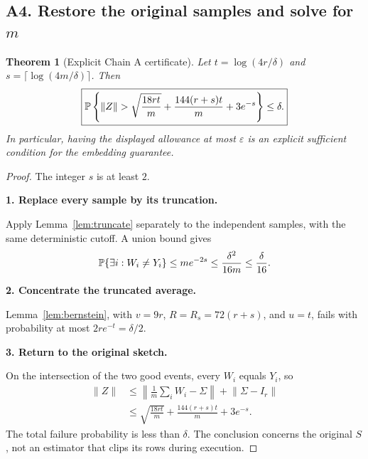 \documentclass[11pt]{article}
\numberwithin{equation}{section}
\newtheorem{theorem}{Theorem}[section]
\theoremstyle{definition}\newtheorem{definition}[theorem]{Definition}
\theoremstyle{remark}\newtheorem{remark}[theorem]{Remark}
\newcommand{\norm}[1]{\lVert#1\rVert}\newcommand{\ip}[2]{\langle#1,#2\rangle}
\newcommand{\step}[1]{\par\addvspace{.65\baselineskip}\Needspace{4\baselineskip}\noindent\textbf{#1}\par\nobreak\smallskip}
\begin{document}
\subsection{A4. Restore the original samples and solve for \texorpdfstring{$m$}{m}}
\begin{theorem}[Explicit Chain A certificate]\label{thm:A}
Let $t=\log(4r/\delta)$ and $s=\lceil\log(4m/\delta)\rceil$. Then
\begin{equation}\label{eq:A-tail}
 \boxed{\Prob\left\{\norm Z>
 \sqrt{\frac{18rt}{m}}+\frac{144(r+s)t}{m}+3e^{-s}\right\}\le\delta.}
\end{equation}
In particular, having the displayed allowance at most $\varepsilon$ is an explicit
sufficient condition for the embedding guarantee.
\end{theorem}
\begin{proof}
The integer $s$ is at least $2$.

\step{1. Replace every sample by its truncation.}
Apply Lemma~\ref{lem:truncate} separately to the
independent samples, with the same deterministic cutoff. A union bound gives
\[
 \mathbb P\{\exists i:W_i\ne Y_i\}\le me^{-2s}
 \le\frac{\delta^2}{16m}\le\frac\delta{16}.
\]

\step{2. Concentrate the truncated average.}
Lemma~\ref{lem:bernstein}, with $v=9r$, $R=R_s=72(r+s)$, and $u=t$, fails with
probability at most $2re^{-t}=\delta/2$.

\step{3. Return to the original sketch.}
On the intersection of the two good events, every $W_i$ equals $Y_i$, so
\begin{align*}
 \norm Z
 &\le\left\|\frac1m\sum_iW_i-\Sigma\right\|+\norm{\Sigma-I_r}\\
 &\le\sqrt{\frac{18rt}{m}}+\frac{144(r+s)t}{m}+3e^{-s}.
\end{align*}
The total failure probability is less than $\delta$. The conclusion concerns the
original $S$, not an estimator that clips its rows during execution.
\end{proof}
\end{document}
